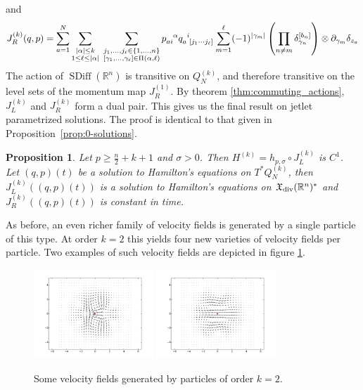 \documentclass[12pt]{amsart}
\newcommand{\R}{\ensuremath{\mathbb{R}}}
\newtheorem{prop}[thm]{Proposition}
\DeclareMathOperator{\SDiff}{SDiff}
\begin{document}
  and
  \begin{equation*}
    J_R^{(k)}(q,p) = \sum_{a=1}^{N}
    \sum_{\substack{ |\alpha| \leq k \\ 1 \leq \ell \leq |\alpha| }} \;
		\sum_{
			\substack{
				j_1,\dots,j_\ell \in \{1,\dots,n\} \\
				[\gamma_1,\dots,\gamma_\ell] \in \Pi(\alpha,\ell)
				}
			}
			p\indices{_a_i^\alpha} q\indices{_a^i_{[j_1 \cdots j_\ell]}}
      \sum_{m=1}^\ell (-1)^{|\gamma_m|}\left( \prod_{n \neq m}  \delta_{\gamma_n}^{[b_n]} \right) \otimes \partial_{\gamma_m}\delta_{z_a}
  \end{equation*}
  The action of $\SDiff(\R^n)$ is transitive on $Q_N^{(k)}$, and
  therefore transitive on the level sets of the momentum map $J_R^{(1)}$.
  By theorem \ref{thm:commuting_actions}, $J_L^{(k)}$ and $J_R^{(k)}$ form a dual pair.
  This gives us the final result on jetlet parametrized solutions.
  The proof is identical to that given in Proposition~\ref{prop:0-solutions}.
  \begin{prop}\label{prop:k-solutions}
    Let $p \ge \frac{n}{2} + k + 1$ and $\sigma > 0$.
    Then $H^{(k)} = h_{p,\sigma} \circ J_L^{(k)}$ is $C^1$.
        Let $(q,p)(t)$ be a solution to Hamilton's equations on 
        $T^*Q^{(k)}_N$, then $J_L^{(k)}( (q,p)(t))$ is a solution to Hamilton's
        equations on $\mathfrak{X}_{\rm div}(\R^n)^*$
        and $J_R^{(k)}( (q,p)(t))$ is constant in time.
  \end{prop}
  
  As before, an even richer family of velocity fields is generated by a single particle of this type.
  At order $k=2$ this yields four new varieties of velocity fields per particle.
  Two examples of such velocity fields are depicted in figure \ref{fig:2_jet}.
  
  \begin{figure}[h!]
  	\centering
	\includegraphics[width=0.4\textwidth]{./images/two_jet_a_2D.pdf}
	\includegraphics[width=0.4\textwidth]{./images/two_jet_b_2D.pdf}
	\caption{Some velocity fields generated by particles of order $k=2$.}
	\label{fig:2_jet}
  \end{figure}
  
\end{document}

